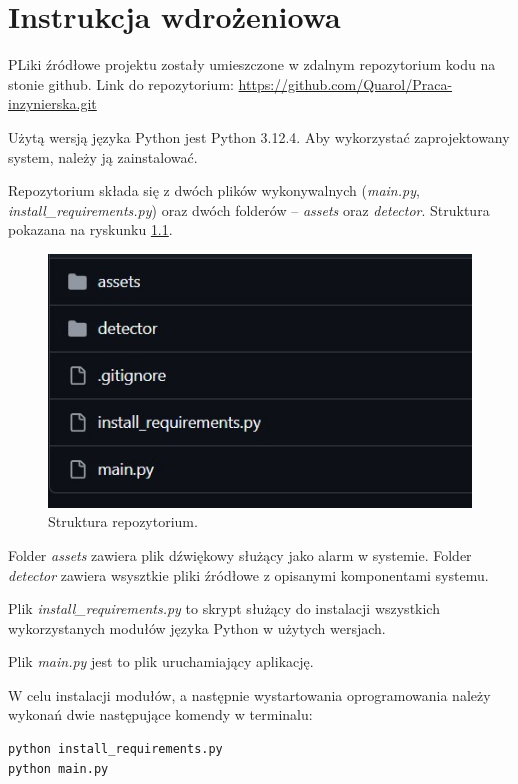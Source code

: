 \chapter{Instrukcja wdrożeniowa}
PLiki źródłowe projektu zostały umieszczone w zdalnym repozytorium kodu na stonie github. 
Link do repozytorium: \url{https://github.com/Quarol/Praca-inzynierska.git}

Użytą wersją języka Python jest Python 3.12.4. Aby wykorzystać zaprojektowany system, należy ją zainstalować.

Repozytorium składa się z dwóch plików wykonywalnych (\emph{main.py}, \emph{install\_requirements.py}) oraz dwóch folderów -- \emph{assets} oraz \emph{detector}. Struktura pokazana na ryskunku \ref{fig:repo}.
\begin{figure}
    \centering
    \includegraphics[width=\linewidth]{_repo.jpg}
    \caption{Struktura repozytorium.}
    \label{fig:repo}
\end{figure}

Folder \emph{assets} zawiera plik dźwiękowy służący jako alarm w systemie. Folder \emph{detector} zawiera wsysztkie pliki źródłowe z opisanymi komponentami systemu.

Plik \emph{install\_requirements.py} to skrypt służący do instalacji wszystkich wykorzystanych modułów języka Python w użytych wersjach.

Plik \emph{main.py} jest to plik uruchamiający aplikację.

W celu instalacji modułów, a następnie wystartowania oprogramowania należy wykonań dwie następujące komendy w terminalu:
\begin{lstlisting}
python install_requirements.py
python main.py
\end{lstlisting}


